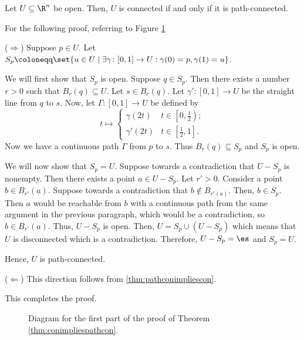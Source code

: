 \documentclass[class=article, crop=false]{standalone}
\begin{document}
\begin{thm}{\label{thm:conimpliespathcon}}
    Let $U \subseteq \R^n$ be open. Then, $U$ is connected if and only if it is path-connected.
\end{thm}
For the following proof, referring to Figure \ref{fig:conimpliespathcon}
\begin{pf}
    ($\Rightarrow$) Suppose $p \in U$. Let $S_p \coloneqq \set{u \in U \mid \exists \gamma \colon [0,1] \to U: \gamma(0) = p, \gamma(1) = u}$.

    We will first show that $S_p$ is open. Suppose $q \in S_p$. Then there exists a number $r > 0$ such that $B_r(q) \subseteq U$. Let $s \in B_r(q)$. Let $\gamma' \colon [0,1] \to U$ be the straight line from $q$ to $s$. Now, let $\Gamma \colon [0,1] \to U$ be defined by
        \[
            t \mapsto
                \begin{cases}
                    \gamma(2t) & t \in \left[0,\frac{1}{2}\right); \\
                    \gamma'(2t) & t \in \left[ \frac{1}{2}, 1\right].
                \end{cases}
        \]
     Now we have a continuous path $\Gamma$ from $p$ to $s$. Thus $B_r(q) \subseteq S_p$ and $S_p$ is open.

     We will now show that $S_p = U$. Suppose towards a contradiction that $U - S_p$ is nonempty. Then there exists a point $a \in U-S_p$. Let $r'>0$. Consider a point $b \in B_{r'}(a)$. Suppose towards a contradiction that $b \not \in B_{r'(a)}$. Then, $b \in S_p$. Then $a$ would be reachable from $b$ with a continuous path from the same argument in the previous paragraph, which would be a contradiction, so $b \in B_{r'}(a)$.
     Thus, $U-S_p$ is open. Then, $U = S_p \cup (U-S_p)$ which means that $U$ is disconnected which is a contradiction. Therefore, $U-S_p = \es$ and $S_p = U$.

     Hence, $U$ is path-connected.

    ($\Leftarrow$) This direction follows from \ref{thm:pathconimpliescon}.

    This completes the proof.
\end{pf}

\begin{figure}[ht]
    \centering
    \caption{Diagram for the first part of the proof of Theorem \ref{thm:conimpliespathcon}.}
    \label{fig:conimpliespathcon}
\end{figure}
\end{document}
